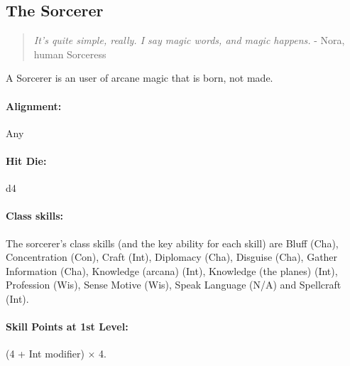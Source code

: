 \subsection[Sorcerer]{The Sorcerer}
\label{sec:Sorcerer}
\begin{quote}
\emph{It's quite simple, really. I say magic words, and magic happens.}
- Nora, human Sorceress
\end{quote}
A Sorcerer is an user of arcane magic that is born, not made.
\paragraph{Alignment:} Any
\paragraph{Hit Die:} d4
\paragraph{Class skills:}
The sorcerer's class skills (and the key ability for each skill) are 
Bluff (Cha), Concentration (Con), Craft (Int), Diplomacy (Cha), Disguise (Cha), Gather Information (Cha), Knowledge (arcana) (Int), Knowledge (the planes) (Int), Profession (Wis), Sense Motive (Wis), Speak Language (N/A) and Spellcraft (Int). 

\paragraph{Skill Points at 1st Level:} (4 + Int modifier) $\times$ 4.
